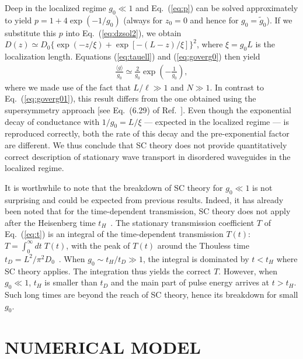 Deep in the localized regime $g_0 \ll 1$ and Eq.~(\ref{eq:p}) can be solved approximately to yield
$p = 1 + 4 \exp(-1/g_0)$ (always for $z_0 = 0$ and hence for $g_0 = {\tilde g}_0$).
If we substitute this $p$ into Eq.~(\ref{eq:dzsol2}), we obtain
$D(z) \simeq D_0 \{ \exp(-z/\xi) + \exp[-(L-z)/\xi] \}^2$, where $\xi = g_0 L$ is the localization length.
Equations (\ref{eq:tauell}) and (\ref{eq:goverg0}) then yield
\begin{eqnarray}
\frac{\langle g \rangle}{g_0} \simeq
\frac{2}{g_0} \exp\left(-\frac{1}{g_0} \right),
\label{eq:goverg02}
\end{eqnarray}
where we made use of the fact that $L/\ell \gg 1$ and $N \gg 1$.
In contrast to Eq.~(\ref{eq:goverg01}), this result differs from the one obtained using the supersymmetry approach [see Eq.~(6.29) of Ref.~\cite{2000_Mirlin}]. Even though the exponential decay of conductance with $1/g_0 = L/\xi$ --- expected in the localized regime --- is reproduced correctly, both the rate of this decay and the pre-exponential factor are different. We thus conclude that SC theory does not provide quantitatively correct description of stationary wave transport in disordered waveguides in the localized regime.

It is worthwhile to note that the breakdown of SC theory for $g_0 \ll 1$ is not surprising and could be expected from previous results. Indeed, it has already been noted that for the time-dependent transmission, SC theory does not apply after the Heisenberg time $t_H$~\cite{2004_Skipetrov}. The stationary transmission coefficient $T$ of Eq.~(\ref{eq:t}) is an integral of the time-dependent transmission $T(t)$: $T = \int_0^{\infty} dt\; T(t)$, with the peak of $T(t)$ around the Thouless time $t_D = L^2/\pi^2 D_0$~\cite{2004_Skipetrov}. When $g_0 \sim t_H/t_D \gg 1$, the integral is dominated by $t < t_H$ where SC theory applies. The integration thus yields the correct $T$. However, when $g_0 \ll 1$, $t_H$ is smaller than $t_D$ and the main part of pulse energy arrives at $t > t_H$. Such long times are beyond the reach of SC theory, hence its breakdown for small $g_0$.

\section{NUMERICAL MODEL}
\label{sec:numerical}

